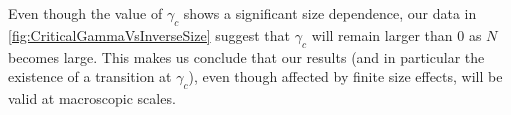 Even though the value of $\gamma_{c}$ shows a significant size dependence, our data in \autoref{fig:CriticalGammaVsInverseSize} suggest that $\gamma_{c}$ will remain larger than 0 as $N$ becomes large. This makes us conclude that our results (and in particular the existence of a transition at $\gamma_{c}$), even though affected by finite size effects, will be valid at macroscopic scales.

